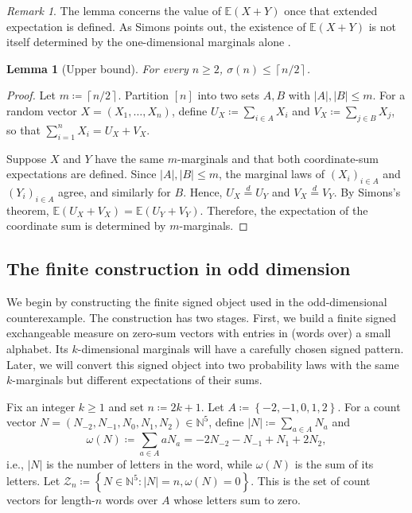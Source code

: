 \documentclass[11pt]{amsart}
\theoremstyle{plain}
\newtheorem{lemma}{Lemma}
\theoremstyle{definition}
\theoremstyle{remark}
\newtheorem{remark}{Remark}
\numberwithin{equation}{section}
\newcommand{\N}{\mathbb N}
\newcommand{\E}{\mathbb E}
\newcommand{\1}{\mathbf 1}
\begin{document}
\begin{remark}
The lemma concerns the value of \(\E\left(X+Y\right)\) once that extended expectation is defined. As Simons points out, the existence of \(\E\left(X+Y\right)\) is not itself determined by the one-dimensional marginals alone \cite[p.~157]{Simons1977Unexpected}.
\end{remark}

\begin{lemma}[Upper bound]
For every \(n\ge2\), \(\sigma\left(n\right)\le\left\lceil n/2\right\rceil\).
\end{lemma}

\begin{proof}
Let \(m\coloneqq\left\lceil n/2\right\rceil\). Partition \(\left[n\right]\) into two sets \(A,B\) with \(\lvert A\rvert,\lvert B\rvert\le m\). For a random vector \(X=\left(X_1,\ldots,X_n\right)\), define \(U_X\coloneqq\sum_{i\in A}X_i\) and \(V_X\coloneqq\sum_{j\in B}X_j\), so that \(\sum_{i=1}^nX_i=U_X+V_X\).

Suppose \(X\) and \(Y\) have the same \(m\)-marginals and that both coordinate-sum expectations are defined. Since \(\lvert A\rvert,\lvert B\rvert\le m\), the marginal laws of \(\left(X_i\right)_{i\in A}\) and \(\left(Y_i\right)_{i\in A}\) agree, and similarly for \(B\). Hence, \(U_X\stackrel{d}=U_Y\) and \(V_X\stackrel{d}=V_Y\). By Simons's theorem, \(\E\left(U_X+V_X\right)=\E\left(U_Y+V_Y\right)\). Therefore, the expectation of the coordinate sum is determined by \(m\)-marginals.
\end{proof}

\subsection{The finite construction in odd dimension}

We begin by constructing the finite signed object used in the odd-dimensional counterexample. The construction has two stages. First, we build a finite signed exchangeable measure on zero-sum vectors with entries in (words over) a small alphabet. Its \(k\)-dimensional marginals will have a carefully chosen signed pattern. Later, we will convert this signed object into two probability laws with the same \(k\)-marginals but different expectations of their sums.

Fix an integer \(k\ge1\) and set \(n\coloneqq2k+1\). Let
\(A\coloneqq\left\{-2,-1,0,1,2\right\}\). For a count vector \(N=\left(N_{-2},N_{-1},N_0,N_1,N_2\right)\in\N^5\), define
\(\left\lvert N\right\rvert\coloneqq\sum_{a\in A}N_a\) and
\[\omega\left(N\right) \coloneqq \sum_{a\in A}aN_a = -2N_{-2}-N_{-1}+N_1+2N_2,\]
i.e., \(\left|N\right|\) is the number of letters in the word, while \(\omega(N)\) is the sum of its letters. Let \(\mathcal Z_n \coloneqq \left\{N\in\N^5\colon\left\lvert N\right\rvert=n,\omega\left(N\right)=0\right\}\). This is the set of count vectors for length-\(n\) words over \(A\) whose letters sum to zero.
\end{document}
